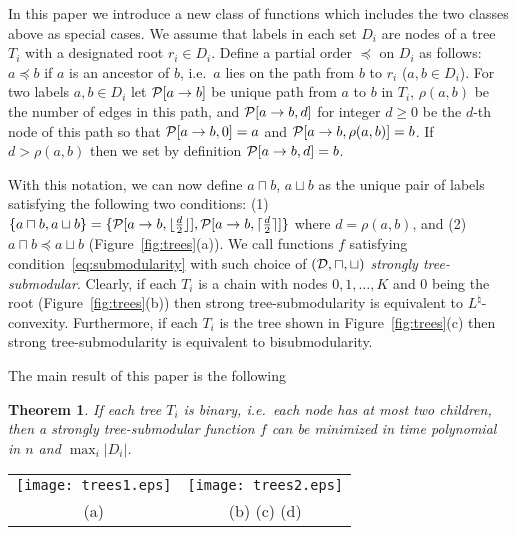 \documentclass[11pt,onecolumn]{article}
\newtheorem{theorem}{Theorem}
\def\D{{\cal D}}
\def\calP{{\cal P}}
\begin{document}
In this paper we introduce a new class of functions which includes the two classes above as special cases.
We assume that labels in each set $D_i$ are nodes of a tree $T_i$ with a designated root $r_i\in D_i$.
Define a partial order $\preceq$ on $D_i$ as follows: $a\preceq b$ if $a$ is an ancestor of $b$,
i.e.\ $a$ lies on the path from $b$ to $r_i$ ($a,b\in D_i$). For two labels $a,b\in D_i$ let $\calP[a\rightarrow b]$ be unique path from $a$ to $b$ in $T_i$,
$\rho(a,b)$ be the number of edges in this path, and $\calP[a\rightarrow b,d]$ for integer $d\ge 0$ be the $d$-th node of this path
so that $\calP[a\rightarrow b,0]=a$ and $\calP[a\rightarrow b,\rho(a,b)]=b$. If $d>\rho(a,b)$ then we set by definition $\calP[a\rightarrow b,d]=b$.

With this notation, we can now define $a\sqcap b$, $a\sqcup b$
as the unique pair of labels satisfying the following two conditions:
(1) $\{a\sqcap b,a\sqcup b\}=\{\calP[a\rightarrow b,\lfloor\frac{d}{2}\rfloor],\calP[a\rightarrow b,\lceil\frac{d}{2}\rceil]\}$
where $d=\rho(a,b)$, and (2) $a\sqcap b\preceq a\sqcup b$ (Figure~\ref{fig:trees}(a)).
We call functions $f$ satisfying condition~\eqref{eq:submodularity} with such choice of $(\D,\sqcap,\sqcup)$ {\em strongly tree-submodular}.
Clearly, if each $T_i$ is a chain with nodes $0,1,\ldots,K$ and $0$ being the root (Figure~\ref{fig:trees}(b)) then strong tree-submodularity is equivalent
to $L^\natural$-convexity. Furthermore, if each $T_i$ is the tree shown in Figure~\ref{fig:trees}(c) then strong tree-submodularity is equivalent to bisubmodularity.

The main result of this paper is the following
\begin{theorem}
If each tree $T_i$ is binary, i.e.\ each node has at most two children, then a strongly tree-submodular function $f$
can be minimized in time polynomial in $n$ and $\max_i |D_i|$.
\label{th:polynomiality}
\end{theorem}

\begin{figure*}[!t]
\begin{center}
\begin{tabular}{c@{\hspace{50pt}}c}
\texttt{[image: trees1.eps]} & \texttt{[image: trees2.eps]} \vspace{-10pt} \\ 
\hspace{30pt} (a) & (b) \hspace{50pt} (c) \hspace{50pt} (d) \hspace{28pt} \vspace{-10pt}
\end{tabular}
\end{center}
\caption{{\bf Examples of trees. Roots are always at the bottom.} (a) Illustration of the definition of $a\sqcap b$, $a\sqcup b$, $a\wedge b$ and $a\vee b$. 
(b) A tree for $L^\natural$-convex functions. (c) A tree for bisubmodular functions. (d) A tree for which a weakly tree-submodular function can be minimized efficiently (see section~\ref{sec:weak}).
}
\label{fig:trees}
\end{figure*}
\end{document}
